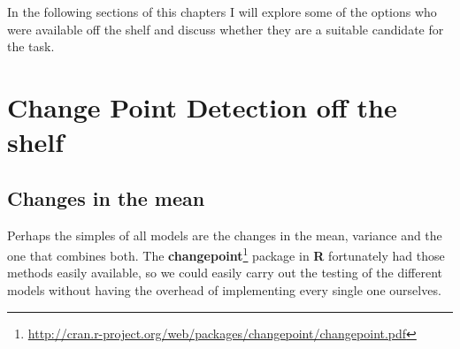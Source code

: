 \documentclass[minf,twoside,singlespacing,parskip,notimes,deptreport]{infthesis} %
\begin{document}
In the following sections of this chapters I will explore some of the options who were available off the shelf and discuss whether they are a suitable candidate for the task. 

\section{Change Point Detection off the shelf}

\subsection{Changes in the mean}
\label{sec:basic}

Perhaps the simples of all models are the changes in the mean, variance and the one that combines both. The \textbf{changepoint}\footnote{\url{http://cran.r-project.org/web/packages/changepoint/changepoint.pdf}} package in \textbf{R} fortunately had those methods easily available, so we could easily carry out the testing of the different models without having the overhead of implementing every single one ourselves. 
\end{document}

